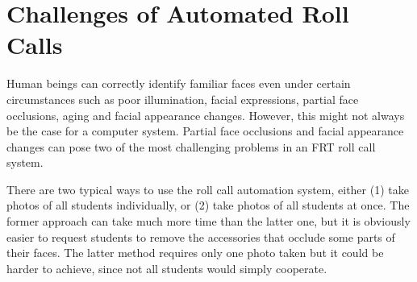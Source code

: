 \section{Challenges of Automated Roll Calls}
Human beings can correctly identify familiar faces even under certain circumstances such as poor illumination,
facial expressions, partial face occlusions, aging and facial appearance changes. However, this might not always
be the case for a computer system. Partial face occlusions and facial appearance changes can pose two of the most
challenging problems in an FRT roll call system.

There are two typical ways to use the roll call automation system, either (1) take photos of all students individually,
or (2) take photos of all students at once. The former approach can take much more time than the latter one, but it
is obviously easier to request students to remove the accessories that occlude some parts of their faces. The latter
method requires only one photo taken but it could be harder to achieve, since not all students would simply cooperate.
